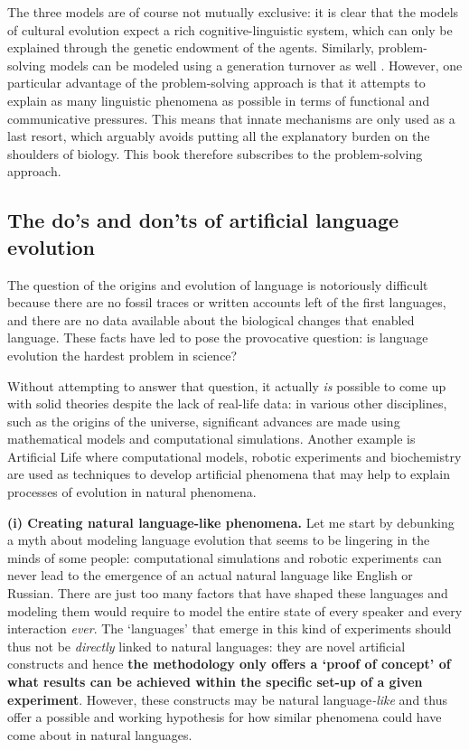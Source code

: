The three models are of course not mutually exclusive: it is clear that the models of cultural evolution expect a rich cognitive-linguistic system, which can only be explained through the genetic endowment of the agents. Similarly, problem-solving models can be modeled using a generation turnover as well \citep{vogt07group}. However, one particular advantage of the problem-solving approach is that it attempts to explain as many linguistic phenomena as possible in terms of functional and communicative pressures. This means that innate mechanisms are only used as a last resort, which arguably avoids putting all the explanatory burden on the shoulders of biology. This book therefore subscribes to the problem-solving approach.


\subsection{The do's and don'ts of artificial language evolution}
\label{s:methodology}

The question of the origins and evolution of language is notoriously difficult because there are no fossil traces or written accounts left of the first languages, and there are no data available about the biological changes that enabled language. These facts have led \citet{kirby03language} to pose the provocative question: is language evolution the hardest problem in science?

Without attempting to answer that question, it actually {\em is} possible to come up with solid theories despite the lack of real-life data: in various other disciplines, such as the origins of the universe, significant advances are made using mathematical models and computational simulations. Another example is Artificial Life where computational models, robotic experiments and biochemistry are used as techniques to develop artificial phenomena that may help to explain processes of evolution in natural phenomena.

{\bfseries (i) Creating natural language-like phenomena.} Let me start by debunking a myth about modeling language evolution that seems to be lingering in the minds of some people: computational simulations and robotic experiments can never lead to the emergence of an actual natural language like English or Russian. There are just too many factors that have shaped these languages and modeling them would require to model the entire state of every speaker and every interaction {\em ever}. The `languages' that emerge in this kind of experiments should thus not be {\em directly} linked to natural languages: they are novel artificial constructs and hence {\bfseries the methodology only offers a `proof of concept' of what results can be achieved within the specific set-up of a given experiment}. However, these constructs may be natural language{\em -like} and thus offer a possible and working hypothesis for how similar phenomena could have come about in natural languages.

